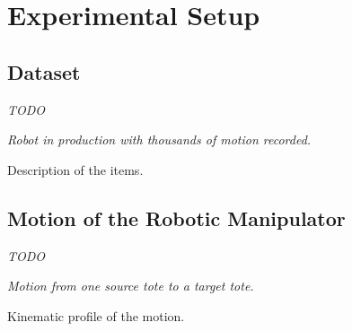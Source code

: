 \documentclass[/home/francois/latex/report/main.tex]{subfiles}
\begin{document}
\chapter{Experimental Setup}
\label{chapter:setup}

\section{Dataset}

\textit{TODO}

{\it
Robot in production with thousands of motion recorded.

Description of the items.
}

\section{Motion of the Robotic Manipulator}


\textit{TODO}

{\it
Motion from one source tote to a target tote.

Kinematic profile of the motion.
}
\end{document}
